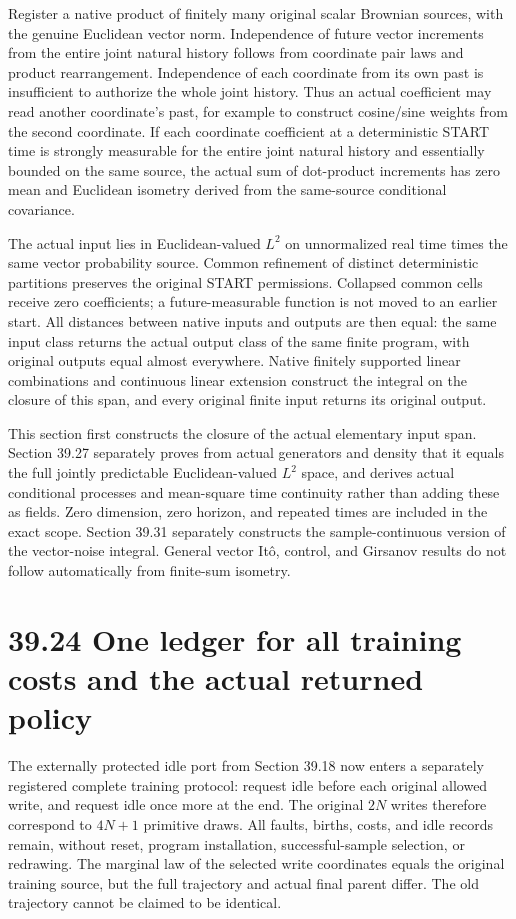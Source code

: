 \documentclass[
  english,
  11pt,
  oneside]{book}
\begin{document}
Register a native product of finitely many original scalar Brownian sources, with the genuine Euclidean vector norm. Independence of future vector increments from the entire joint natural history follows from coordinate pair laws and product rearrangement. Independence of each coordinate from its own past is insufficient to authorize the whole joint history. Thus an actual coefficient may read another coordinate's past, for example to construct cosine/sine weights from the second coordinate. If each coordinate coefficient at a deterministic START time is strongly measurable for the entire joint natural history and essentially bounded on the same source, the actual sum of dot-product increments has zero mean and Euclidean isometry derived from the same-source conditional covariance.

The actual input lies in Euclidean-valued \(L^2\) on unnormalized real time times the same vector probability source. Common refinement of distinct deterministic partitions preserves the original START permissions. Collapsed common cells receive zero coefficients; a future-measurable function is not moved to an earlier start. All distances between native inputs and outputs are then equal: the same input class returns the actual output class of the same finite program, with original outputs equal almost everywhere. Native finitely supported linear combinations and continuous linear extension construct the integral on the closure of this span, and every original finite input returns its original output.

This section first constructs the closure of the actual elementary input span. Section 39.27 separately proves from actual generators and density that it equals the full jointly predictable Euclidean-valued \(L^2\) space, and derives actual conditional processes and mean-square time continuity rather than adding these as fields. Zero dimension, zero horizon, and repeated times are included in the exact scope. Section 39.31 separately constructs the sample-continuous version of the vector-noise integral. General vector Itô, control, and Girsanov results do not follow automatically from finite-sum isometry.

\section{39.24 One ledger for all training costs and the actual returned policy}\label{one-ledger-for-all-training-costs-and-the-actual-returned-policy}

The externally protected idle port from Section 39.18 now enters a separately registered complete training protocol: request idle before each original allowed write, and request idle once more at the end. The original \(2N\) writes therefore correspond to \(4N+1\) primitive draws. All faults, births, costs, and idle records remain, without reset, program installation, successful-sample selection, or redrawing. The marginal law of the selected write coordinates equals the original training source, but the full trajectory and actual final parent differ. The old trajectory cannot be claimed to be identical.
\end{document}
